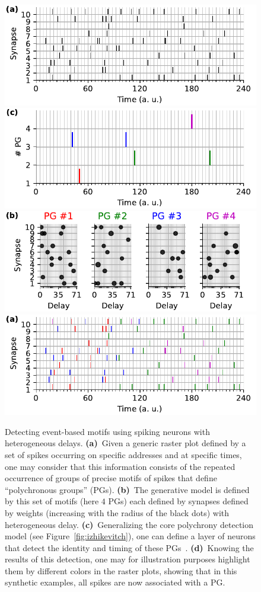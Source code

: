 \documentclass[brainsci, %
               review,submit,pdftex,moreauthors
               ]{Definitions/mdpi}
\begin{document}
\begin{figure}%
  \centering
  \includegraphics[width=0.490\linewidth]{figures/THC_1a_k.pdf}
  \includegraphics[width=0.490\linewidth]{figures/THC_1c.pdf}
  \includegraphics[width=0.490\linewidth]{figures/THC_1b.pdf}
  \includegraphics[width=0.490\linewidth]{figures/THC_1a.pdf}
    \caption{Detecting event-based motifs using spiking neurons with heterogeneous delays. 
    {\bf (a)}~Given a generic raster plot defined by a set of spikes occurring on specific addresses and at specific times, one may consider that this information consists of the repeated occurrence of groups of precise motifs of spikes that define ``polychronous groups'' (PGs). 
    {\bf (b)}~The generative model is defined by this set of motifs (here $4$ PGs) each defined by  synapses defined by weights (increasing with the radius of the black dots) with heterogeneous delay. 
    {\bf (c)}~Generalizing the core polychrony detection model (see Figure~\ref{fig:izhikevitch}), one can define a layer of neurons that detect the identity and timing of these PGs~\citep{grimaldi_learning_2022}. %
    {\bf (d)}~Knowing the results of this detection, one may for illustration purposes highlight them by different colors in the raster plots, showing that in this synthetic examples, all spikes are now associated with a PG. 
     }
  \label{fig:THC} %
\end{figure}
\end{document}
